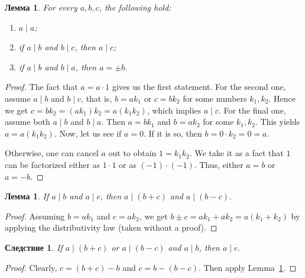\documentclass[12pt,notitlepage]{article}
\theoremstyle{plain}
\newtheorem{lemma}[thm]{Лемма}
\newtheorem{corr}[thm]{Следствие}
\theoremstyle{definition}
\theoremstyle{plain}
\newcommand{\1}{\mathbf{1}}
\newcommand{\0}{\mathbf{0}}
\newcommand{\dvd}{\mathop{\mid}}
\begin{document}
\begin{lemma}\label{L4:l1}
	For every $a,b,c$, the following hold:
	\begin{enumerate}
		\item $a \dvd a$;
		\item if $a \dvd b$ and $b \dvd c$, then $a \dvd c$;
		\item if $a \dvd b$ and $b \dvd a$, then $a = \pm b$.
	\end{enumerate}
\end{lemma}
\begin{proof}
	The fact that $a = a \cdot 1$ gives us the first statement. For the second one, assume $a \dvd b$ and $b \dvd c$, that is, $b = ak_1$ or $c = bk_2$ for some numbers $k_1, k_2$. Hence we get $c = bk_2 = (a k_1) k_2 = a (k_1 k_2)$, which implies $a \dvd c$. For the final one, assume both $a \dvd b$ and $b \dvd a$. Then $a = b k_1$ and $b = a k_2$ for some $k_1, k_2$. This yields $a = a (k_1 k_2)$. Now, let us see if $a = 0$. If it is so, then $b = 0 \cdot k_2 = 0 = a$.
	
	Otherwise, one can cancel $a$ out to obtain $1 = k_1 k_2$. We take it as a fact that $1$ can be factorized either as $1\cdot 1$ or as $(-1) \cdot (-1)$. Thus, either $a = b$ or $a = -b$.
\end{proof}

\begin{lemma}\label{L4:l2}
	If $a \dvd b$ and $a \dvd c$, then $a \dvd (b + c)$ and $a \dvd (b - c)$.
\end{lemma}
\begin{proof}
	Assuming $b = ak_1$ and $c = ak_2$, we get $b \pm c = ak_1 + ak_2 = a(k_1 + k_2)$ by applying the distributivity law (taken without a proof).
\end{proof}
\begin{corr}\label{L4:c3}
	If $a \dvd (b + c)$ or $a \dvd (b - c) $ and $a \dvd b$, then $a \dvd c$.
\end{corr}
\begin{proof}
	Clearly, $c = (b + c) - b$ and $c = b - (b - c)$. Then apply Lemma~\ref{L4:l2}.
\end{proof}
\end{document}
